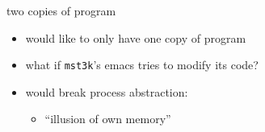 \begin{frame}{two copies of program}
\begin{itemize}
\item would like to only have one copy of program
\vspace{.5cm}
\item what if {\tt mst3k}'s emacs tries to modify its code?
\item would break process abstraction:
    \begin{itemize}
        \item ``illusion of own memory''
    \end{itemize}
\end{itemize}
\end{frame}

